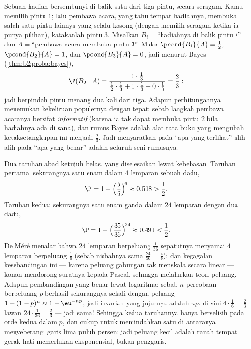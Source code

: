 \begin{example}\label{ex:b2:proba:montyhall}
Sebuah hadiah bersembunyi di balik satu dari tiga pintu, secara seragam. Kamu memilih
pintu $1$; lalu pembawa acara, yang tahu tempat hadiahnya, membuka salah satu
pintu lainnya yang selalu kosong (dengan memilih seragam ketika ia punya
pilihan), katakanlah pintu $3$. Misalkan $B_i = {}$``hadiahnya di balik pintu
$i$'' dan $A = {}$``pembawa acara membuka pintu $3$''. Maka
$\pcond{B_1}{A} = \frac12$, $\pcond{B_2}{A} = 1$, dan
$\pcond{B_3}{A} = 0$, jadi menurut Bayes
(\cref{thm:b2:proba:bayes}),
\[
\P(B_2 \mid A)
= \frac{1\cdot\frac13}
{\frac12\cdot\frac13 + 1\cdot\frac13 + 0\cdot\frac13}
= \frac23 :
\]
jadi berpindah pintu menang dua kali dari tiga. Adapun perhitungannya
menemukan kekeliruan populernya dengan tepat: sebab langkah pembawa acaranya bersifat
\emph{informatif} (karena ia tak dapat membuka pintu $2$ bila hadiahnya
ada di sana), dan rumus Bayes adalah alat tata buku
yang mengubah ketaksetangkupan ini menjadi $\frac23$. Jadi menyaratkan
pada ``apa yang terlihat'' alih-alih pada ``apa yang benar'' adalah
seluruh seni rumusnya.
\end{example}

\begin{example}\label{ex:b2:proba:demere}
Dua taruhan abad ketujuh belas, yang diselesaikan lewat kebebasan. Taruhan
pertama: sekurangnya satu enam dalam $4$ lemparan sebuah dadu,
\[
\P = 1 - \Bigl(\frac56\Bigr)^{\!4} \approx 0.518 > \frac12 .
\]
Taruhan kedua: sekurangnya satu enam ganda dalam $24$ lemparan dengan dua dadu,
\[
\P = 1 - \Bigl(\frac{35}{36}\Bigr)^{\!24} \approx 0.491 <
\frac12 .
\]
De Méré menalar bahwa $24$ lemparan berpeluang $\frac1{36}$
sepatutnya menyamai $4$ lemparan berpeluang $\frac16$ (sebab nisbahnya sama
$\frac{24}{36} = \frac46$); dan kegagalan kesebandingan
ini --- karena peluang gabungan tak menskala
secara linear --- konon mendorong suratnya kepada Pascal,
sehingga melahirkan teori peluang. Adapun pembandingan
yang benar lewat logaritma: sebab $n$ percobaan berpeluang $p$
berhasil sekurangnya sekali dengan peluang $1 - (1-p)^n \approx
1 - \eu^{-np}$, jadi invarian yang jujurnya adalah $np$: di sini
$4\cdot\frac16 = \frac23$ lawan $24\cdot\frac1{36} =
\frac23$ --- jadi sama! Sehingga kedua taruhannya hanya berselisih pada orde
kedua dalam $p$, dan cukup untuk memindahkan satu di antaranya menyeberangi
garis lima puluh persen: jadi peluang kecil adalah ranah tempat
gerak hati memerlukan eksponensial, bukan penggaris.
\end{example}

